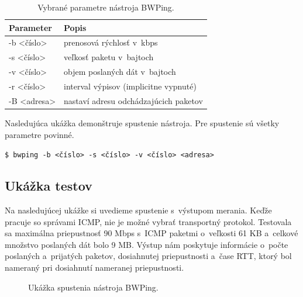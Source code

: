         \begin{table}[H]
            \begin{center}
                \begin{tabular}{|l|p{11cm}|}
                    \hline
                     \textbf{Parameter}  &  \textbf{Popis}  \\
                    \hline
                    -b \textless číslo\textgreater & prenosová rýchlosť v~kbps\\
                    -s \textless číslo\textgreater & veľkosť paketu v~bajtoch\\
                    -v \textless číslo\textgreater & objem poslaných dát
                        v~bajtoch\\
                    -r \textless číslo\textgreater & interval výpisov 
                        (implicitne vypnuté) \\
                    -B \textless adresa\textgreater & nastaví adresu
                        odchádzajúcich paketov\\
                    \hline
                \end{tabular}
                \caption{Vybrané parametre nástroja BWPing.} 
                \label{tab_bwping_parametre}
            \end{center}
        \end{table}

        \noindent Nasledujúca ukážka demonštruje spustenie nástroja. Pre spustenie sú 
        všetky parametre povinné.

        \begin{flushleft}
            \texttt{\$ bwping -b <číslo> -s <číslo> -v <číslo> <adresa>} 
        \end{flushleft}

        \subsection{Ukážka testov} \label{bwping_testy}
        Na nasledujúcej ukážke si uvedieme spustenie s~výstupom merania. Keďže
        pracuje so správami ICMP, nie je možné vybrať transportný protokol.
        Testovala sa maximálna priepustnosť 90 Mbps s~ICMP paketmi o~veľkosti 61 KB
        a~celkové množstvo poslaných dát bolo 9 MB. Výstup nám poskytuje
        informácie o~počte poslaných a~prijatých paketov, dosiahnutej
        priepustnosti a~čase RTT, ktorý bol nameraný pri dosiahnutí nameranej
        priepustnosti.

       \begin{figure}[H]
           \begin{center}
                   \caption{Ukážka spustenia nástroja BWPing.}
               \label{bwping}
           \end{center}
       \end{figure}
       
